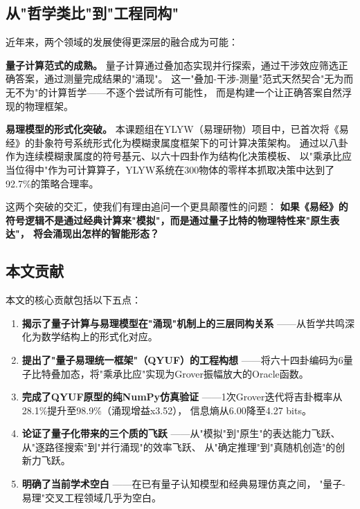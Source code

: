 \documentclass[twocolumn]{article}
\begin{document}
\subsection{从"哲学类比"到"工程同构"}

近年来，两个领域的发展使得更深层的融合成为可能：

\textbf{量子计算范式的成熟。}
量子计算通过叠加态实现并行探索，通过干涉效应筛选正确答案，通过测量完成结果的"涌现"。
这一"叠加-干涉-测量"范式天然契合"无为而无不为"的计算哲学——不逐个尝试所有可能性，
而是构建一个让正确答案自然浮现的物理框架\cite{nielsen2010}。

\textbf{易理模型的形式化突破。}
本课题组在YLYW（易理研物）项目中，已首次将《易经》的卦象符号系统形式化为模糊隶属度框架下的可计算决策架构\cite{ylyw2026}。
通过以八卦作为连续模糊隶属度的符号基元、以六十四卦作为结构化决策模板、
以"乘承比应当位得中"作为可计算算子，YLYW系统在300物体的零样本抓取决策中达到了92.7\%的策略合理率。

这两个突破的交汇，使我们有理由追问一个更具颠覆性的问题：
\textbf{如果《易经》的符号逻辑不是通过经典计算来"模拟"，而是通过量子比特的物理特性来"原生表达"，
将会涌现出怎样的智能形态？}

\subsection{本文贡献}

本文的核心贡献包括以下五点：

\begin{enumerate}
  \item \textbf{揭示了量子计算与易理模型在"涌现"机制上的三层同构关系}
        ——从哲学共鸣深化为数学结构上的形式化对应。
  \item \textbf{提出了"量子易理统一框架"（QYUF）的工程构想}
        ——将六十四卦编码为6量子比特叠加态，将"乘承比应"实现为Grover振幅放大的Oracle函数。
  \item \textbf{完成了QYUF原型的纯NumPy仿真验证}
        ——1次Grover迭代将吉卦概率从28.1\%提升至98.9\%（涌现增益x3.52），
        信息熵从6.00降至4.27 bits。
  \item \textbf{论证了量子化带来的三个质的飞跃}
        ——从"模拟"到"原生"的表达能力飞跃、从"逐路径搜索"到"并行涌现"的效率飞跃、
        从"确定推理"到"真随机创造"的创新力飞跃。
  \item \textbf{明确了当前学术空白}
        ——在已有量子认知模型\cite{busemeyer2015}和经典易理仿真之间，
        "量子-易理"交叉工程领域几乎为空白。
\end{enumerate}
\end{document}
